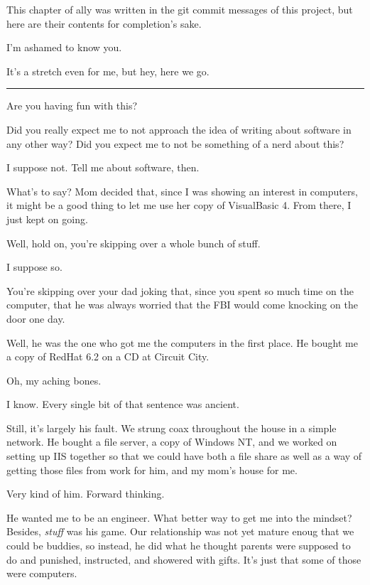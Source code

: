 \noindent This chapter of ally was written in the git commit messages of this project, but here are their contents for completion's sake.

\begin{ally}
I'm ashamed to know you.
\end{ally}
It's a stretch even for me, but hey, here we go.

\begin{center}
\rule{1in}{0.1pt}
\end{center}

\begin{ally}
Are you having fun with this?
\end{ally}
Did you really expect me to not approach the idea of writing about software in any other way? Did you expect me to not be something of a nerd about this?

\begin{ally}
I suppose not. Tell me about software, then.
\end{ally}
What's to say? Mom decided that, since I was showing an interest in computers, it might be a good thing to let me use her copy of VisualBasic 4. From there, I just kept on going.

\begin{ally}
Well, hold on, you're skipping over a whole bunch of stuff.
\end{ally}
I suppose so.

\begin{ally}
You're skipping over your dad joking that, since you spent so much time on the computer, that he was always worried that the FBI would come knocking on the door one day.
\end{ally}
Well, he was the one who got me the computers in the first place. He bought me a copy of RedHat 6.2 on a CD at Circuit City.

\begin{ally}
Oh, my aching bones.
\end{ally}
I know. Every single bit of that sentence was ancient.

Still, it's largely his fault. We strung coax throughout the house in a simple network. He bought a file server, a copy of Windows NT, and we worked on setting up IIS together so that we could have both a file share as well as a way of getting those files from work for him, and my mom's house for me.

\begin{ally}
Very kind of him. Forward thinking.
\end{ally}
He wanted me to be an engineer. What better way to get me into the mindset? Besides, \emph{stuff} was his game. Our relationship was not yet mature enoug that we could be buddies, so instead, he did what he thought parents were supposed to do and punished, instructed, and showered with gifts. It's just that some of those were computers.

